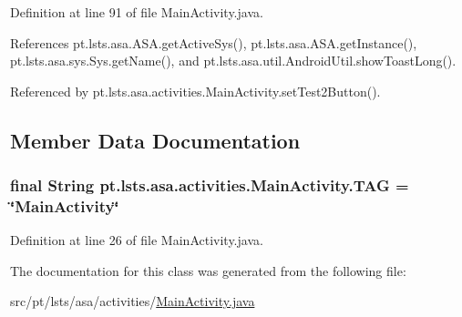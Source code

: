 Definition at line 91 of file Main\+Activity.\+java.



References pt.\+lsts.\+asa.\+A\+S\+A.\+get\+Active\+Sys(), pt.\+lsts.\+asa.\+A\+S\+A.\+get\+Instance(), pt.\+lsts.\+asa.\+sys.\+Sys.\+get\+Name(), and pt.\+lsts.\+asa.\+util.\+Android\+Util.\+show\+Toast\+Long().



Referenced by pt.\+lsts.\+asa.\+activities.\+Main\+Activity.\+set\+Test2\+Button().



\subsection{Member Data Documentation}
\hypertarget{classpt_1_1lsts_1_1asa_1_1activities_1_1MainActivity_a6bf94fc26340460c59818c12bd15c2c3}{}
\subsubsection[{T\+A\+G}]{\setlength{\rightskip}{0pt plus 5cm}final String pt.\+lsts.\+asa.\+activities.\+Main\+Activity.\+T\+A\+G = \char`\"{}Main\+Activity\char`\"{}\hspace{0.3cm}{\ttfamily [static]}}\label{classpt_1_1lsts_1_1asa_1_1activities_1_1MainActivity_a6bf94fc26340460c59818c12bd15c2c3}


Definition at line 26 of file Main\+Activity.\+java.



The documentation for this class was generated from the following file\+:\begin{DoxyCompactItemize}
\item 
src/pt/lsts/asa/activities/\hyperlink{MainActivity_8java}{Main\+Activity.\+java}\end{DoxyCompactItemize}
